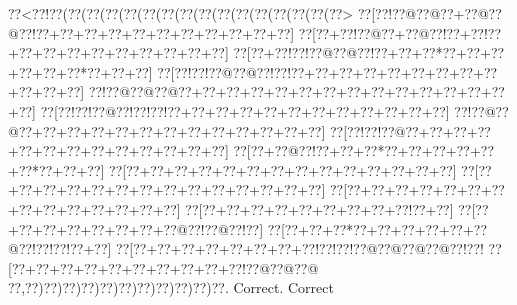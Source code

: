\documentclass[a5paper]{article}
\begin{document}
\begin{center}
{\goo
\0??<\0??!\0??(\0??(\0??(\0??(\0??(\0??(\0??(\0??(\0??(\0??(\0??(\0??(\0??(\0??(\0??(\0??>
\0??[\0??!\0??@\0??@\0??+\0??@\0??@\0??!\0??+\0??+\0??+\0??+\0??+\0??+\0??+\0??+\0??+\0??+\0??]
\0??[\0??+\0??!\0??@\0??+\0??@\0??!\0??+\0??!\0??+\0??+\0??+\0??+\0??+\0??+\0??+\0??+\0??+\0??]
\0??[\0??+\0??!\0??!\0??@\0??@\0??!\0??+\0??+\0??*\0??+\0??+\0??+\0??+\0??+\0??*\0??+\0??+\0??]
\0??[\0??!\0??!\0??@\0??@\0??!\0??!\0??+\0??+\0??+\0??+\0??+\0??+\0??+\0??+\0??+\0??+\0??+\0??]
\0??!\0??@\0??@\0??@\0??+\0??+\0??+\0??+\0??+\0??+\0??+\0??+\0??+\0??+\0??+\0??+\0??+\0??+\0??]
\0??[\0??!\0??!\0??@\0??!\0??!\0??!\0??+\0??+\0??+\0??+\0??+\0??+\0??+\0??+\0??+\0??+\0??+\0??]
\0??!\0??@\0??@\0??+\0??+\0??+\0??+\0??+\0??+\0??+\0??+\0??+\0??+\0??+\0??+\0??]
\0??[\0??!\0??!\0??@\0??+\0??+\0??+\0??+\0??+\0??+\0??+\0??+\0??+\0??+\0??+\0??+\0??]
\0??[\0??+\0??@\0??!\0??+\0??+\0??*\0??+\0??+\0??+\0??+\0??+\0??*\0??+\0??+\0??]
\0??[\0??+\0??+\0??+\0??+\0??+\0??+\0??+\0??+\0??+\0??+\0??+\0??+\0??+\0??]
\0??[\0??+\0??+\0??+\0??+\0??+\0??+\0??+\0??+\0??+\0??+\0??+\0??+\0??+\0??]
\0??[\0??+\0??+\0??+\0??+\0??+\0??+\0??+\0??+\0??+\0??+\0??+\0??+\0??+\0??]
\0??[\0??+\0??+\0??+\0??+\0??+\0??+\0??+\0??+\0??!\0??+\0??]
\0??[\0??+\0??+\0??+\0??+\0??+\0??+\0??+\0??@\0??!\0??@\0??!\0??]
\0??[\0??+\0??+\0??*\0??+\0??+\0??+\0??+\0??+\0??@\0??!\0??!\0??!\0??+\0??]
\0??[\0??+\0??+\0??+\0??+\0??+\0??+\0??+\0??!\0??!\0??!\0??@\0??@\0??@\0??@\0??!\0??!
\0??[\0??+\0??+\0??+\0??+\0??+\0??+\0??+\0??+\0??+\0??!\0??@\0??@\0??@
\0??,\0??)\0??)\0??)\0??)\0??)\0??)\0??)\0??)\0??)\0??)\0??.
}
Correct. Correct

\end{center}
\end{document}
